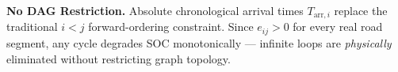 \documentclass[a0,portrait]{a0poster}
\newenvironment{infobox}[1][PosterGray!60]{%
  \begin{mdframed}[backgroundcolor=#1,linecolor=PosterNavy,linewidth=1.2pt,
    innertopmargin=6pt,innerbottommargin=6pt,
    innerleftmargin=8pt,innerrightmargin=8pt,roundcorner=4pt]
}{%
  \end{mdframed}
}
\begin{document}
\begin{minipage}[t][83cm]{0.34\linewidth}
\vspace{0.3cm}

\hspace*{1.2em}%
\begin{minipage}{\dimexpr\linewidth-1.2em\relax}
\begin{infobox}[PosterTeal!10]
\small\textbf{No DAG Restriction.}  Absolute chronological arrival times
$T_{\text{arr},i}$ replace the traditional $i<j$ forward-ordering
constraint.  Since $e_{ij}>0$ for every real road segment, any cycle
degrades SOC monotonically --- infinite loops are \emph{physically}
eliminated without restricting graph topology.
\end{infobox}
\end{minipage}

\vfill
\end{minipage}
\hfill
\end{document}
